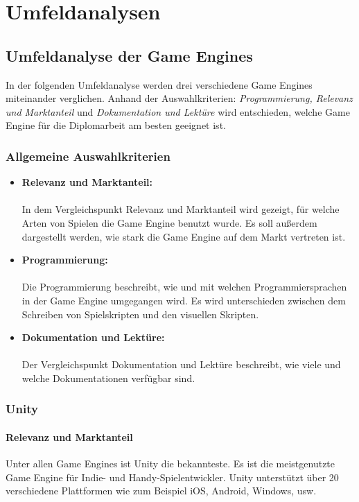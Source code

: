 \chapter{Umfeldanalysen}
\section{Umfeldanalyse der Game Engines}
In der folgenden Umfeldanalyse werden drei verschiedene Game Engines miteinander verglichen. Anhand der Auswahlkriterien: \textit{Programmierung, Relevanz und Marktanteil} und \textit{Dokumentation und Lektüre} wird entschieden, welche Game Engine für die Diplomarbeit am besten geeignet ist.

\subsection{Allgemeine Auswahlkriterien}
\begin{itemize}
  \item \textbf{Relevanz und Marktanteil:}\\\\ In dem Vergleichspunkt Relevanz und Marktanteil wird gezeigt, für welche Arten von Spielen die Game Engine benutzt wurde. Es soll außerdem dargestellt werden, wie stark die Game Engine auf dem Markt vertreten ist.
  \item \textbf{Programmierung:}\\\\ Die Programmierung beschreibt, wie und mit welchen Programmiersprachen in der Game Engine umgegangen wird. Es wird unterschieden zwischen dem Schreiben von Spielskripten und den visuellen Skripten.
  \item \textbf{Dokumentation und Lektüre:}\\\\ Der Vergleichspunkt Dokumentation und Lektüre beschreibt, wie viele und welche Dokumentationen verfügbar sind.
\end{itemize}

\pagebreak

\subsection{Unity}
\subsubsection{Relevanz und Marktanteil}
Unter allen Game Engines ist Unity die bekannteste. Es ist die meistgenutzte Game Engine für Indie- und Handy-Spielentwickler. Unity unterstützt über 20 verschiedene Plattformen wie zum Beispiel iOS, Android, Windows, usw.

